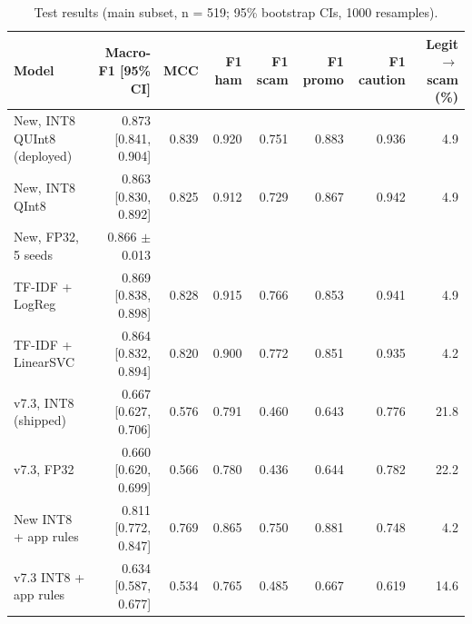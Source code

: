 \begin{table}[t]
\centering
\caption{Test results (main subset, n = 519; 95\% bootstrap CIs, 1000 resamples).}
\label{tab:main}
\small
\begin{tabular}{lrrrrrrr}
\toprule
Model & Macro-F1 [95\% CI] & MCC & F1 ham & F1 scam & F1 promo & F1 caution & Legit$\to$scam (\%) \\
\midrule
New, INT8 QUInt8 (deployed) & 0.873 [0.841, 0.904] & 0.839 & 0.920 & 0.751 & 0.883 & 0.936 & 4.9 \\
New, INT8 QInt8 & 0.863 [0.830, 0.892] & 0.825 & 0.912 & 0.729 & 0.867 & 0.942 & 4.9 \\
New, FP32, 5 seeds & 0.866 $\pm$ 0.013 &  &  &  &  &  &  \\
TF-IDF + LogReg & 0.869 [0.838, 0.898] & 0.828 & 0.915 & 0.766 & 0.853 & 0.941 & 4.9 \\
TF-IDF + LinearSVC & 0.864 [0.832, 0.894] & 0.820 & 0.900 & 0.772 & 0.851 & 0.935 & 4.2 \\
v7.3, INT8 (shipped) & 0.667 [0.627, 0.706] & 0.576 & 0.791 & 0.460 & 0.643 & 0.776 & 21.8 \\
v7.3, FP32 & 0.660 [0.620, 0.699] & 0.566 & 0.780 & 0.436 & 0.644 & 0.782 & 22.2 \\
New INT8 + app rules & 0.811 [0.772, 0.847] & 0.769 & 0.865 & 0.750 & 0.881 & 0.748 & 4.2 \\
v7.3 INT8 + app rules & 0.634 [0.587, 0.677] & 0.534 & 0.765 & 0.485 & 0.667 & 0.619 & 14.6 \\
\bottomrule
\end{tabular}
\end{table}
